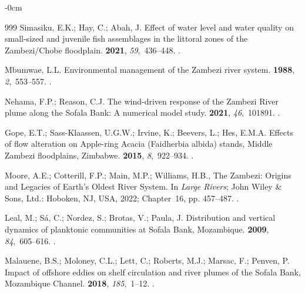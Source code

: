 \documentclass[coasts,article,accept,pdftex,oneauthor]{Definitions/mdpi}
\begin{document}
\begin{adjustwidth}{-\extralength}{0cm}
\begin{thebibliography}{999}
Simasiku, E.K.; Hay, C.; Abah, J.
\newblock Effect of water level and water quality on small-sized and juvenile
  fish assemblages in the littoral zones of the Zambezi/Chobe floodplain.
 {\bf 2021}, {\em 59},~436--448.
.

Mbumwae, L.L.
\newblock Environmental management of the Zambezi river system.
 {\bf 1988}, {\em
  2},~553--557.
.

Nehama, F.P.; Reason, C.J.
\newblock The wind-driven response of the Zambezi River plume along the Sofala
  Bank: A numerical model study.
 {\bf 2021}, {\em
  46},~101891.
.

Gope, E.T.; Sass-Klaassen, U.G.W.; Irvine, K.; Beevers, L.; Hes, E.M.A.
\newblock Effects of flow alteration on Apple-ring Acacia (Faidherbia albida)
  stands, Middle Zambezi floodplains, Zimbabwe.
 {\bf 2015}, {\em 8},~922--934.
.

Moore, A.E.; Cotterill, F.P.; Main, M.P.; Williams, H.B., The Zambezi: Origins
  and Legacies of Earth's Oldest River System.
\newblock In {\em Large Rivers}; John Wiley \& Sons, Ltd.: Hoboken, NJ, USA, 2022; Chapter~16, %
  pp. 457--487.
.

Leal, M.; Sá, C.; Nordez, S.; Brotas, V.; Paula, J.
\newblock Distribution and vertical dynamics of planktonic communities at
  Sofala Bank, Mozambique.
 {\bf 2009}, {\em
  84},~605--616.
.

Malauene, B.S.; Moloney, C.L.; Lett, C.; Roberts, M.J.; Marsac, F.; Penven, P.
\newblock Impact of offshore eddies on shelf circulation and river plumes of
  the Sofala Bank, Mozambique Channel.
 {\bf 2018}, {\em 185},~1--12.
.


\end{thebibliography}
\end{adjustwidth}
\end{document}
